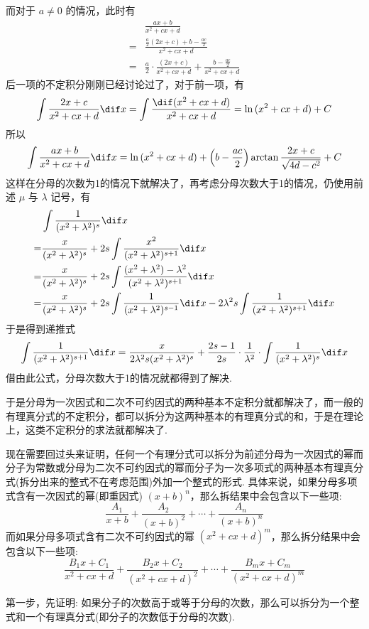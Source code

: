 而对于 $a \neq 0$ 的情况，此时有
\begin{align*}
    & \frac{ax+b}{x^2+cx+d} \\
    = & \frac{\frac{a}{2}(2x+c)+b-\frac{ac}{2}}{x^2+cx+d} \\
    = & \frac{a}{2} \cdot \frac{(2x+c)}{x^2+cx+d} + \frac{b-\frac{ac}{2}}{x^2+cx+d}
\end{align*}
后一项的不定积分刚刚已经讨论过了，对于前一项，有
\[ \int \frac{2x+c}{x^2+cx+d} \dif x = \int \frac{\dif (x^2+cx+d)}{x^2+cx+d} = \ln{(x^2+cx+d)} + C \]
所以
\[ \int \frac{ax+b}{x^2+cx+d} \dif x = \ln{(x^2+cx+d)} + \left( b-\frac{ac}{2} \right) \arctan{\frac{2x+c}{\sqrt{4d-c^2}}} + C \]
这样在分母的次数为1的情况下就解决了，再考虑分母次数大于1的情况，仍使用前述 $\mu$ 与 $\lambda$ 记号，有
\begin{align*}
  & \int \frac{1}{(x^2+\lambda^2)^s} \dif x \\
  = & \frac{x}{(x^2+\lambda^2)^s}+2s \int \frac{x^2}{(x^2+\lambda^2)^{s+1}} \dif x \\
  = & \frac{x}{(x^2+\lambda^2)^s}+2s \int \frac{(x^2+\lambda^2)-\lambda^2}{(x^2+\lambda^2)^{s+1}} \dif x \\
  = & \frac{x}{(x^2+\lambda^2)^s}+2s \int \frac{1}{(x^2+\lambda^2)^{s-1}} \dif x -2\lambda^2s \int \frac{1}{(x^2+\lambda^2)^{s+1}} \dif x \\
\end{align*}
于是得到递推式
\[ \int \frac{1}{(x^2+\lambda^2)^{s+1}} \dif x = \frac{x}{2\lambda^2s (x^2+\lambda^2)^s} + \frac{2s-1}{2s} \cdot \frac{1}{\lambda^2} \cdot \int \frac{1}{(x^2+\lambda^2)^s} \dif x \]
借由此公式，分母次数大于1的情况就都得到了解决.

于是分母为一次因式和二次不可约因式的两种基本不定积分就都解决了，而一般的有理真分式的不定积分，都可以拆分为这两种基本的有理真分式的和，于是在理论上，这类不定积分的求法就都解决了.

现在需要回过头来证明，任何一个有理分式可以拆分为前述分母为一次因式的幂而分子为常数或分母为二次不可约因式的幂而分子为一次多项式的两种基本有理真分式(拆分出来的整式不在考虑范围)外加一个整式的形式. 具体来说，如果分母多项式含有一次因式的幂(即重因式) $(x+b)^n$，那么拆结果中会包含以下一些项:
\[ \frac{A_{1}}{x+b} + \frac{A_{2}}{(x+b)^{2}} + \cdots + \frac{A_{n}}{(x+b)^n} \]
而如果分母多项式含有二次不可约因式的幂 $(x^2+cx+d)^m$，那么拆分结果中会包含以下一些项:
\[ \frac{B_{1}x+C_{1}}{x^2+cx+d} + \frac{B_{2}x+C_{2}}{(x^2+cx+d)^{2}} + \cdots + \frac{B_{m}x+C_{m}}{(x^2+cx+d)^{m}} \]

第一步，先证明: 如果分子的次数高于或等于分母的次数，那么可以拆分为一个整式和一个有理真分式(即分子的次数低于分母的次数).

